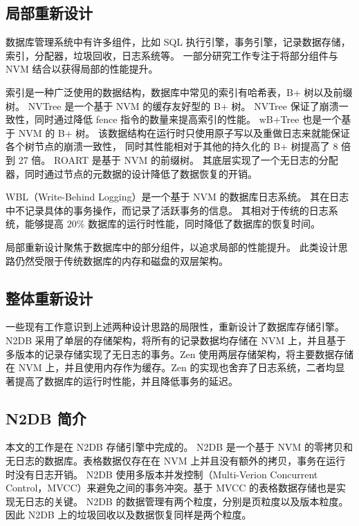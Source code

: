 \subsection{局部重新设计}

数据库管理系统中有许多组件，比如 SQL 执行引擎，事务引擎，记录数据存储，索引，分配器，垃圾回收，日志系统等。
一部分研究工作专注于将部分组件与 NVM 结合以获得局部的性能提升。

索引是一种广泛使用的数据结构，数据库中常见的索引有哈希表，B+ 树以及前缀树。
NVTree\cite{nv-tree} 是一个基于 NVM 的缓存友好型的 B+ 树。
NVTree 保证了崩溃一致性，同时通过降低 fence 指令的数量来提高索引的性能。
wB+Tree\cite{chen2015persistent} 也是一个基于 NVM 的 B+ 树。
该数据结构在运行时只使用原子写以及重做日志来就能保证各个树节点的崩溃一致性，
同时其性能相对于其他的持久化的 B+ 树提高了 8 倍到 27 倍。
ROART\cite{ma_roart_2021} 是基于 NVM 的前缀树。
其底层实现了一个无日志的分配器，同时通过节点的元数据的设计降低了数据恢复的开销。

WBL（Write-Behind Logging）是一个基于 NVM 的数据库日志系统\cite{wbl}。
其在日志中不记录具体的事务操作，而记录了活跃事务的信息。
其相对于传统的日志系统，能够提高 $20\%$ 数据库的运行时性能，同时降低了数据库的恢复时间。

局部重新设计聚焦于数据库中的部分组件，以追求局部的性能提升。
此类设计思路仍然受限于传统数据库的内存和磁盘的双层架构。

\subsection{整体重新设计}

一些现有工作意识到上述两种设计思路的局限性，重新设计了数据库存储引擎。N2DB 采用了单层的存储架构，将所有的记录数据均存储在 NVM 上，并且基于多版本的记录存储实现了无日志的事务\cite{liu_graduate}。Zen 使用两层存储架构，将主要数据存储在 NVM 上，并且使用内存作为缓存。Zen 的实现也舍弃了日志系统，二者均显著提高了数据库的运行时性能，并且降低事务的延迟\cite{liu_zen_2021}。

\subsection{N2DB 简介}
\label{ssec:n2db}
本文的工作是在 N2DB 存储引擎中完成的。
N2DB 是一个基于 NVM 的零拷贝和无日志的数据库。表格数据仅存在在 NVM 上并且没有额外的拷贝，事务在运行时没有日志开销。
N2DB 使用多版本并发控制（Multi-Verion Concurrent Control，MVCC）来避免之间的事务冲突。基于 MVCC 的表格数据存储也是实现无日志的关键。
N2DB 的数据管理有两个粒度，分别是页粒度以及版本粒度。
因此 N2DB 上的垃圾回收以及数据恢复同样是两个粒度。

